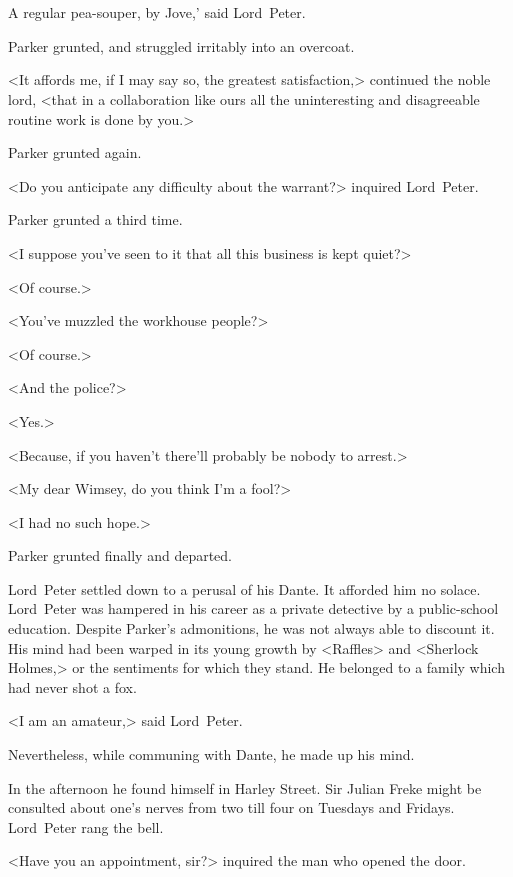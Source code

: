 \chapter[Chapter \thechapter]{}
\lettrine[lines=4,ante=‘]{A}{} regular pea-souper, by Jove,' said Lord~Peter.

\zz
Parker grunted, and struggled irritably into an overcoat.

\zz
<It affords me, if I may say so, the greatest satisfaction,> continued the noble lord, <that in a collaboration like ours all the uninteresting and disagreeable routine work is done by you.>

Parker grunted again.

<Do you anticipate any difficulty about the warrant?> inquired Lord~Peter.

Parker grunted a third time.

<I suppose you've seen to it that all this business is kept quiet?>

<Of course.>

<You've muzzled the workhouse people?>

<Of course.>

<And the police?>

<Yes.>

<Because, if you haven't there'll probably be nobody to arrest.>

<My dear Wimsey, do you think I'm a fool?>

<I had no such hope.>

Parker grunted finally and departed.

Lord~Peter settled down to a perusal of his Dante. It afforded him no solace. Lord~Peter was hampered in his career as a private detective by a public-school education. Despite Parker's admonitions, he was not always able to discount it. His mind had been warped in its young growth by <Raffles> and <Sherlock Holmes,> or the sentiments for which they stand. He belonged to a family which had never shot a fox.

<I am an amateur,> said Lord~Peter.

Nevertheless, while communing with Dante, he made up his mind.

In the afternoon he found himself in Harley Street. Sir Julian Freke might be consulted about one's nerves from two till four on Tuesdays and Fridays. Lord~Peter rang the bell.

<Have you an appointment, sir?> inquired the man who opened the door.

